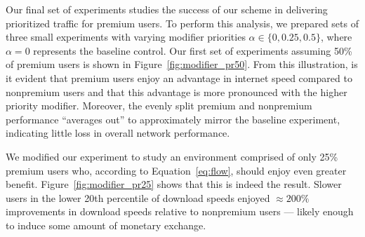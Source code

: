 Our final set of experiments studies the success of our scheme in delivering
prioritized traffic for premium users. To perform this analysis, we prepared
sets of three small experiments with varying modifier priorities
$\alpha \in \{0, 0.25, 0.5\}$, where $\alpha = 0$ represents the baseline
control. Our first set of experiments assuming 50\% of premium users is shown in
Figure~\ref{fig:modifier_pr50}. From this illustration, is it evident that
premium users enjoy an advantage in internet speed compared to nonpremium users
and that this advantage is more pronounced with the higher priority
modifier. Moreover, the evenly split premium and nonpremium performance
``averages out'' to approximately mirror the baseline experiment, indicating
little loss in overall network performance.

We modified our experiment to study an environment comprised of only 25\%
premium users who, according to Equation~\ref{eq:flow}, should enjoy even
greater benefit. Figure~\ref{fig:modifier_pr25} shows that this is indeed the
result. Slower users in the lower 20th percentile of download speeds enjoyed
$\approx 200\%$ improvements in download speeds relative to nonpremium users ---
likely enough to induce some amount of monetary exchange.


